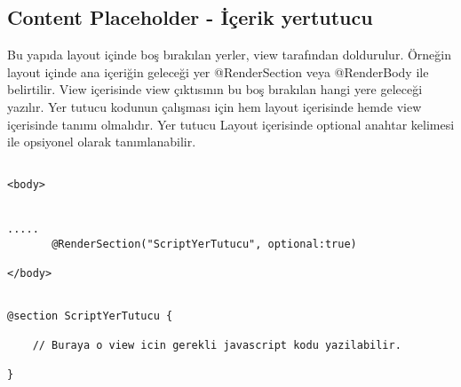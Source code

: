 \documentclass[10pt,a4paper]{article}
\begin{document}
\subsection{Content Placeholder - İçerik yertutucu }

Bu yapıda layout içinde boş bırakılan yerler, view tarafından doldurulur.
Örneğin layout içinde ana içeriğin geleceği yer @RenderSection veya @RenderBody
ile belirtilir.
View içerisinde view çıktısının bu boş bırakılan hangi yere geleceği yazılır.
Yer tutucu kodunun çalışması için hem layout içerisinde hemde view içerisinde tanımı olmalıdır.
Yer tutucu Layout içerisinde optional anahtar kelimesi ile opsiyonel olarak tanımlanabilir.



\begin{lstlisting}[label=code-ContentPlaceHolderLayout,caption=İçerik yertutucu - Layout ]

<body>


.....
       @RenderSection("ScriptYerTutucu", optional:true)

</body>

\end{lstlisting}


\begin{lstlisting}[label=code-ContentPlaceHolderView,caption=İçerik yertutucu - View ]

@section ScriptYerTutucu {

	// Buraya o view icin gerekli javascript kodu yazilabilir.
	
}

\end{lstlisting}




% 

\end{document}
